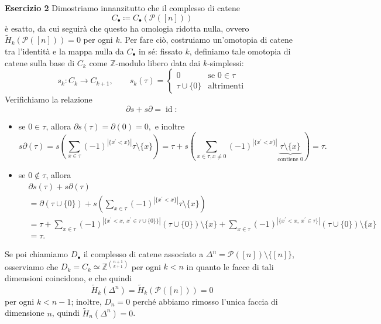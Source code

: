 \documentclass[a4paper]{article}
\newcommand{\Z}{\mathbb{Z}}
\theoremstyle{definition}
\theoremstyle{definition}
\theoremstyle{remark}
\theoremstyle{definition}
\begin{document}
\textbf{Esercizio 2}
Dimostriamo innanzitutto che il complesso di catene $$C_\bullet\coloneqq C_\bullet(\mathcal{P}{([n])})$$ è esatto, da cui seguirà che questo ha omologia ridotta nulla, ovvero $\widetilde{H}_k(\mathcal{P}{([n])}) =
0$ per ogni $k$. Per fare ciò, costruiamo un'omotopia di catene tra l'identità e la mappa nulla da $C_\bullet$ in sé: fissato $k$, definiamo tale omotopia di catene sulla base di $C_k$ come $\Z$-modulo libero data dai $k$-simplessi:
\[
    s_k: C_k \to C_{k+1},\qquad s_k(\tau) =
    \begin{cases}
        0 & \text{se } 0 \in \tau \\
         \tau \cup\{0\} & \text{altrimenti}
    \end{cases}
\]
Verifichiamo la relazione
\[
    \partial s + s\partial = \operatorname{id}
:\]
\begin{itemize}
    \item se $0 \in \tau$, allora $\partial s(\tau) = \partial(0) = 0,$ e inoltre
        \[
            s \partial (\tau) = s \left(\sum_{x\in \tau} (-1)^{|\{x^\prime < x\}|} \tau\setminus\{x\} \right) = \tau + s \left(\sum_{x\in \tau,x\neq 0} (-1)^{|\{
                x^\prime < x\}|} \underbrace{\tau\setminus\{x\}}_{\text{contiene 0}} \right) = \tau
        .\]
    \item se $0 \notin \tau$, allora
        \begin{align*}
           &\partial s(\tau) + s\partial(\tau) \\
           &= \partial(\tau \cup \{0\}) + s\left(\sum_{x\in \tau} (-1)^{|\{x^\prime < x\}|} \tau\setminus\{x\}\right) \\
           &= \tau + \sum_{x\in \tau} (-1)^{|\{x^\prime < x,~x^\prime\in\tau\cup\{0\}\}|} (\tau\cup\{0\})\setminus\{x\} + \sum_{x\in \tau} (-1)^{|\{x^\prime < x,~x^\prime\in\tau\}|} (\tau\cup\{0\})\setminus\{x\} \\
            &= \tau.
    \end{align*}
\end{itemize}

    Se poi chiamiamo $D_\bullet$ il complesso di catene associato a $\Delta^n=\mathcal{P}{([n])}\setminus \{[n]\}$, osserviamo che $D_k=C_k\simeq \Z^{\binom{n+1}{k+1}}$ per ogni
    $k<n$ in quanto le facce di tali dimensioni coincidono, e che quindi
    \[
        \widetilde{H}_k(\Delta^n) = \widetilde{H}_k(\mathcal{P}([n])) = 0
    \]
    per ogni $k<n-1$; inoltre, $D_{n}=0$ perché abbiamo rimosso l'unica faccia di dimensione $n$, quindi $\widetilde{H}_n(\Delta^n) = 0$.
\end{document}

